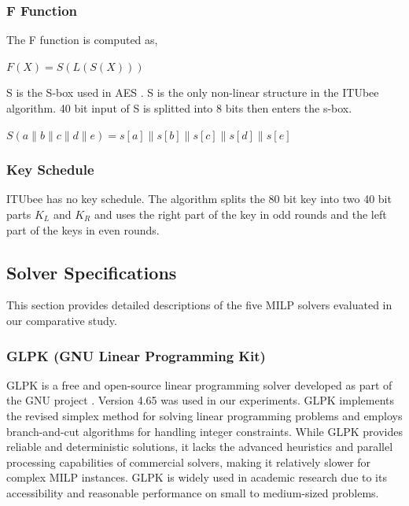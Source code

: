 \documentclass[11pt,a4paper]{article}
\begin{document}
\subsubsection{F Function}
The F function is computed as,\\
\begin{center}
    $F (X) = S(L(S(X)))$
\end{center}

S is the S-box used in AES \cite{dworkin2001advanced}. S is the only non-linear structure in the ITUbee algorithm.  40 bit input of S is splitted into 8 bits then enters the s-box.
\begin{center}
    $S(a\parallel b \parallel c \parallel d \parallel e) = s[a] \parallel s[b] \parallel s[c] \parallel s[d] \parallel s[e]$ 
\end{center}

\subsubsection{Key Schedule}

ITUbee has no key schedule. The algorithm splits the 80 bit key into two 40 bit parts $K_L$ and $K_R$ and uses the right part of the key in odd rounds and the left part of the keys in even rounds.




\subsection{Solver Specifications}
This section provides detailed descriptions of the five MILP solvers evaluated in our comparative study.

\subsubsection{GLPK (GNU Linear Programming Kit)}
GLPK is a free and open-source linear programming solver developed as part of the GNU project \cite{glpk2024}. Version 4.65 was used in our experiments. GLPK implements the revised simplex method for solving linear programming problems and employs branch-and-cut algorithms for handling integer constraints. While GLPK provides reliable and deterministic solutions, it lacks the advanced heuristics and parallel processing capabilities of commercial solvers, making it relatively slower for complex MILP instances. GLPK is widely used in academic research due to its accessibility and reasonable performance on small to medium-sized problems.
\end{document}
